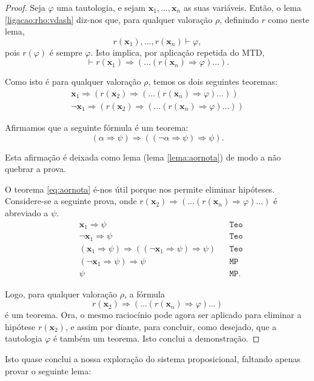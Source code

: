 \documentclass{report}
\theoremstyle{definition}
\theoremstyle{remark}
\renewcommand{\bf}[1]{\mathbf{#1}}
\newcommand{\imply}{\mathbin{\Rightarrow}}
\begin{document}
	\begin{proof}
	Seja $\varphi$ uma tautologia, e sejam $\bf x_1, \dots, \bf x_n$ as suas variáveis. Então, o lema \ref{ligacao:rho:vdash} diz-nos que, para qualquer valoração $\rho$, definindo $r$ como neste lema,
	\[r(\bf x_1), \dots, r(\bf x_n) \vdash \varphi,\]
	pois $r(\varphi)$ é sempre $\varphi$. Isto implica, por aplicação repetida do MTD,
	\[\vdash r(\bf x_1) \imply ( \dots (r(\bf x_n) \imply \varphi) \dots ).\]
	
	Como isto é para qualquer valoração $\rho$, temos os dois seguintes teoremas:
	\begin{gather*}
	\bf x_1 \imply ( r(\bf x_2) \imply (\dots (r(\bf x_n) \imply \varphi) \dots ))\\
	\neg \bf x_1 \imply ( r(\bf x_2) \imply (\dots (r(\bf x_n) \imply \varphi) \dots ))
	\end{gather*}
	
	Afirmamos que a seguinte fórmula é um teorema:
	\begin{equation}\label{eq:aornota}
	(\alpha \imply \psi) \imply ((\neg \alpha \imply \psi) \imply \psi).
	\end{equation}
	
	Esta afirmação é deixada como lema (lema \ref{lema:aornota}) de modo a não quebrar a prova.
	
	O teorema \eqref{eq:aornota} é-nos útil porque nos permite eliminar hipóteses. Considere-se a seguinte prova, onde $r(\bf x_2) \imply (\dots (r(\bf x_n) \imply \varphi) \dots )$ é abreviado a $\psi$.
	\begin{align*}
	&\bf x_1 \imply \psi&&\texttt{Teo}\\
	&\neg \bf x_1 \imply \psi&&\texttt{Teo}\\
	&(\bf x_1 \imply \psi) \imply ((\neg \bf x_1 \imply \psi) \imply \psi)&&\texttt{Teo}\\
	&(\neg \bf x_1 \imply \psi) \imply \psi&&\texttt{MP}\\
	&\psi&&\texttt{MP}.
	\end{align*}
	
	Logo, para qualquer valoração $\rho$, a fórmula
	\[r(\bf x_2) \imply (\dots (r(\bf x_n) \imply \varphi) \dots )\]
	é um teorema. Ora, o mesmo raciocínio pode agora ser aplicado para eliminar a hipótese $r(\bf x_2)$, e assim por diante, para concluir, como desejado, que a tautologia $\varphi$ é também um teorema. Isto conclui a demonstração.
	\end{proof}
	
	Isto quase conclui a nossa exploração do sistema proposicional, faltando apenas provar o seguinte lema:
	
\end{document}
